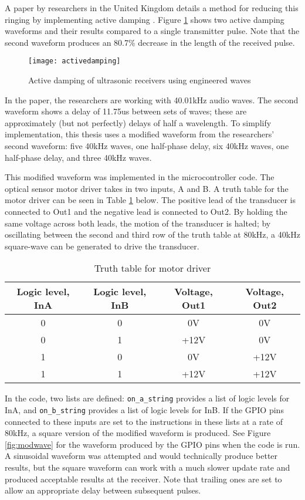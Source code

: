 \documentclass[11pt]{ucthesisCP}
\begin{document}
A paper by researchers in the United Kingdom details a method for reducing this ringing by implementing active damping \cite{activedamping}. Figure \ref{fig:activedamping} shows two active damping waveforms and their results compared to a single transmitter pulse. Note that the second waveform produces an 80.7\% decrease in the length of the received pulse.

\begin{figure}[htbp]
	\centering
	\texttt{[image: activedamping]}
	\caption{Active damping of ultrasonic receivers using engineered waves \cite{activedamping}}
	\label{fig:activedamping}
\end{figure}


In the paper, the researchers are working with 40.01kHz audio waves. The second waveform shows a delay of 11.75us between sets of waves; these are approximately (but not perfectly) delays of half a wavelength. To simplify implementation, this thesis uses a modified waveform from the researchers’ second waveform: five 40kHz waves, one half-phase delay, six 40kHz waves, one half-phase delay, and three 40kHz waves. 

This modified waveform was implemented in the microcontroller code. The optical sensor motor driver takes in two inputs, A and B. A truth table for the motor driver can be seen in Table \ref{tab:truth} below. The positive lead of the transducer is connected to Out1 and the negative lead is connected to Out2. By holding the same voltage across both leads, the motion of the transducer is halted; by oscillating between the second and third row of the truth table at 80kHz, a 40kHz square-wave can be generated to drive the transducer.

\begin{table}[htbp]
	\centering
	\caption{Truth table for motor driver}
	\label{tab:truth}
	\begin{tabular}{|c|c|c|c|}
		\hline
		Logic level, InA & Logic level, InB & Voltage, Out1 & Voltage, Out2 \\
		\hline
		0 & 0 & 0V & 0V \\
		\hline
		0 & 1 & +12V & 0V \\
		\hline
		1 & 0 & 0V & +12V \\
		\hline
		1 & 1 & +12V & +12V \\
		\hline
	\end{tabular}
\end{table}

In the code, two lists are defined: \verb|on_a_string| provides a list of logic levels for InA, and \verb|on_b_string| provides a list of logic levels for InB. If the GPIO pins connected to these inputs are set to the instructions in these lists at a rate of 80kHz, a square version of the modified waveform is produced. See Figure \ref{fig:modwave} for the waveform produced by the GPIO pins when the code is run. A sinusoidal waveform was attempted and would technically produce better results, but the square waveform can work with a much slower update rate and produced acceptable results at the receiver. Note that trailing ones are set to allow an appropriate delay between subsequent pulses.
\end{document}
